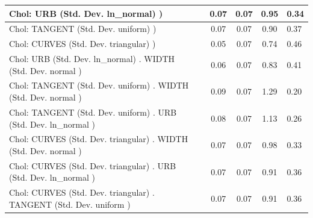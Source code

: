 \begin{table}
\begin{center}
\begin{tabular}{|l|l|c|c|c|l|}
			\hline
			 Chol: URB (Std. Dev. ln_normal) ) &  & 0.07 & 0.07 & 0.95 & 0.34 \\
			\hline
			 Chol: TANGENT (Std. Dev. uniform) ) &  & 0.07 & 0.07 & 0.90 & 0.37 \\
			\hline
			 Chol: CURVES (Std. Dev. triangular) ) &  & 0.05 & 0.07 & 0.74 & 0.46 \\
			\hline
			 Chol: URB (Std. Dev. ln_normal) . WIDTH (Std. Dev.   normal ) &  & 0.06 & 0.07 & 0.83 & 0.41 \\
			\hline
			 Chol: TANGENT (Std. Dev. uniform) . WIDTH (Std. Dev.   normal ) &  & 0.09 & 0.07 & 1.29 & 0.20 \\
			\hline
			 Chol: TANGENT (Std. Dev. uniform) . URB (Std. Dev.   ln_normal ) &  & 0.08 & 0.07 & 1.13 & 0.26 \\
			\hline
			 Chol: CURVES (Std. Dev. triangular) . WIDTH (Std. Dev.   normal ) &  & 0.07 & 0.07 & 0.98 & 0.33 \\
			\hline
			 Chol: CURVES (Std. Dev. triangular) . URB (Std. Dev.   ln_normal ) &  & 0.07 & 0.07 & 0.91 & 0.36 \\
			\hline
			 Chol: CURVES (Std. Dev. triangular) . TANGENT (Std. Dev.   uniform ) &  & 0.07 & 0.07 & 0.91 & 0.36 \\
			\hline
		\end{tabular}
	\end{center}
\end{table}